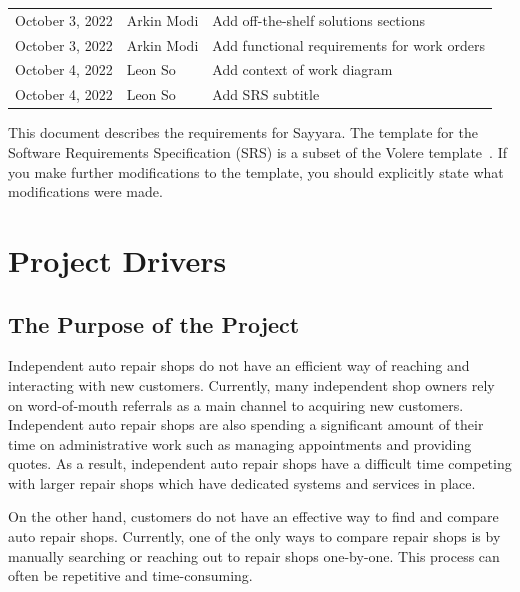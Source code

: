 \documentclass[12pt]{article}
\begin{document}
\begin{table}[hp]
\begin{tabularx}{\textwidth}{llX}
		October 3, 2022    & Arkin Modi            & Add off-the-shelf solutions sections                                               \\
		October 3, 2022    & Arkin Modi            & Add functional requirements for work orders                                        \\
		October 4, 2022    & Leon So               & Add context of work diagram                                                        \\
		October 4, 2022    & Leon So               & Add SRS subtitle                                                                   \\
		\bottomrule
	\end{tabularx}
\end{table}

\newpage


This document describes the requirements for Sayyara. The template for the Software Requirements
Specification (SRS) is a subset of the Volere template~\citep{RobertsonAndRobertson2012}. If you
make further modifications to the template, you should explicitly state what modifications were
made.

\section{Project Drivers}

\subsection{The Purpose of the Project}

Independent auto repair shops do not have an efficient way of reaching and interacting with new
customers. Currently, many independent shop owners rely on word-of-mouth referrals as a main
channel to acquiring new customers. Independent auto repair shops are also spending a significant
amount of their time on administrative work such as managing appointments and providing quotes. As
a result, independent auto repair shops have a difficult time competing with larger repair shops
which have dedicated systems and services in place.

On the other hand, customers do not have an effective way to find and compare auto repair shops.
Currently, one of the only ways to compare repair shops is by manually searching or reaching out to
repair shops one-by-one. This process can often be repetitive and time-consuming.
\end{document}
